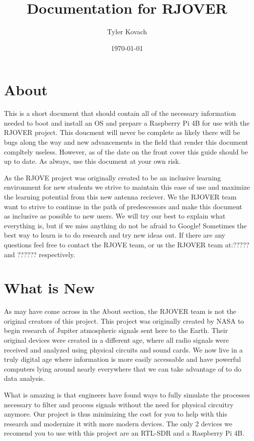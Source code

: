 \documentclass[letterpaper,12pt,notitlepage]{report} %
\title{Documentation for RJOVER}
\author{Tyler Kovach}
\date{\today}
\begin{document}
\maketitle
\tableofcontents
\section{About}
This is a short document that should contain all of the necessary information needed to boot and install an OS and prepare a Raspberry Pi 4B for use with the RJOVER project. This doucment will never be complete as likely there will be bugs along the way and new advancements in the field that render this document compltely useless. However, as of the date on the front cover this guide should be up to date. As always, use this document at your own risk. 

As the RJOVE project was originally created to be an inclusive learning environment for new students we strive to maintain this ease of use and maximize the learning potential from this new antenna reciever. We the RJOVER team want to strive to continue in the path of predescessors and make this document as inclusive as possible to new users. We will try our best to explain what everything is, but if we miss anything do not be afraid to Google! Sometimes the best way to learn is to do research and try new ideas out. If there are any questions feel free to contact the RJOVE team, or us the RJOVER team at:????? and ?????? respectively.

\section{What is New}
As may have come across in the About section, the RJOVER team is not the original creators of this project. This project was originally created by NASA to begin research of Jupiter atmospheric signals sent here to the Earth. Their original devices were created in a different age, where all radio signals were received and analyzed using physical circuits and sound cards. We now live in a truly digital age where information is more easily accessable and have powerful computers lying around nearly everywhere that we can take advantage of to do data analysis. 

What is amazing is that engineers have found ways to fully simulate the processes necessary to filter and process signals without the need for physical circuitry anymore. Our project is thus minimizing the cost for you to help with this research and modernize it with more modern devices. The only 2 devices we recomend you to use with this project are an RTL-SDR and a Raspberry Pi 4B.
\end{document}
